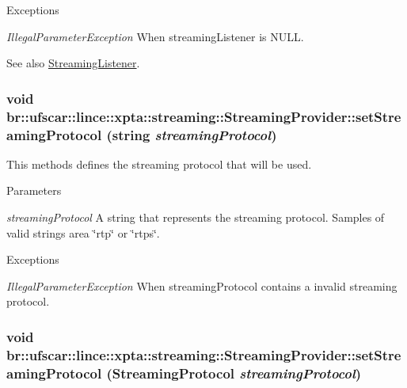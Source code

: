 \begin{DoxyExceptions}{Exceptions}
\item[{\em IllegalParameterException}]When streamingListener is NULL. \end{DoxyExceptions}
\begin{DoxySeeAlso}{See also}
\hyperlink{classbr_1_1ufscar_1_1lince_1_1xpta_1_1streaming_1_1StreamingListener}{StreamingListener}. 
\end{DoxySeeAlso}
\hypertarget{classbr_1_1ufscar_1_1lince_1_1xpta_1_1streaming_1_1StreamingProvider_a9afc0aa0416ae6925e8fa312a57b08d3}{
\subsubsection[{setStreamingProtocol}]{\setlength{\rightskip}{0pt plus 5cm}void br::ufscar::lince::xpta::streaming::StreamingProvider::setStreamingProtocol (string {\em streamingProtocol})}}
\label{classbr_1_1ufscar_1_1lince_1_1xpta_1_1streaming_1_1StreamingProvider_a9afc0aa0416ae6925e8fa312a57b08d3}


This methods defines the streaming protocol that will be used. 


\begin{DoxyParams}{Parameters}
\item[{\em streamingProtocol}]A string that represents the streaming protocol. Samples of valid strings area \char`\"{}rtp\char`\"{} or \char`\"{}rtps\char`\"{}. \end{DoxyParams}

\begin{DoxyExceptions}{Exceptions}
\item[{\em IllegalParameterException}]When streamingProtocol contains a invalid streaming protocol. \end{DoxyExceptions}
\hypertarget{classbr_1_1ufscar_1_1lince_1_1xpta_1_1streaming_1_1StreamingProvider_a8a61c4a2e411c5b3717727c37b67d4bd}{
\subsubsection[{setStreamingProtocol}]{\setlength{\rightskip}{0pt plus 5cm}void br::ufscar::lince::xpta::streaming::StreamingProvider::setStreamingProtocol (StreamingProtocol {\em streamingProtocol})}}
\label{classbr_1_1ufscar_1_1lince_1_1xpta_1_1streaming_1_1StreamingProvider_a8a61c4a2e411c5b3717727c37b67d4bd}


